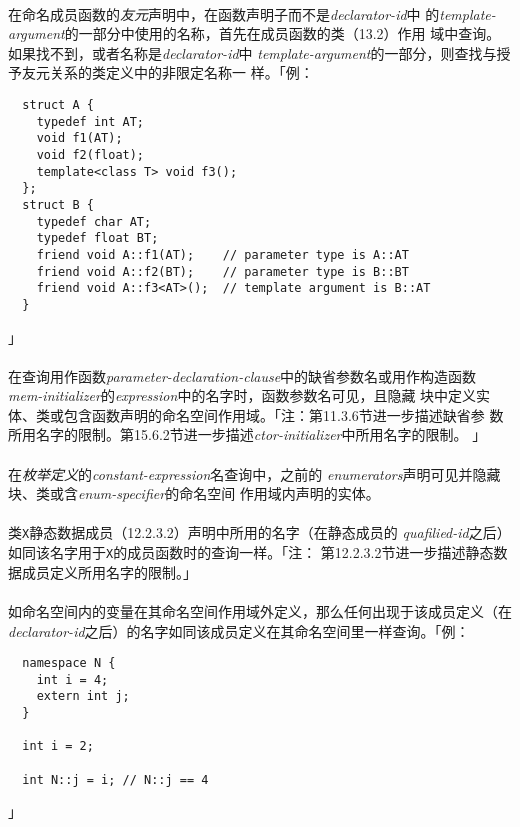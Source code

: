 \paragraph{}
在命名成员函数的\textit{友元}声明中，在函数声明子而不是\textit{declarator-id}中
的\textit{template-argument}的一部分中使用的名称，首先在成员函数的类（13.2）作用
域中查询。 如果找不到，或者名称是\textit{declarator-id}中
\textit{template-argument}的一部分，则查找与授予友元关系的类定义中的非限定名称一
样。「例：
\begin{lstlisting}
  struct A {
    typedef int AT;
    void f1(AT);
    void f2(float);
    template<class T> void f3();
  };
  struct B {
    typedef char AT;
    typedef float BT;
    friend void A::f1(AT);    // parameter type is A::AT
    friend void A::f2(BT);    // parameter type is B::BT
    friend void A::f3<AT>();  // template argument is B::AT
  }
\end{lstlisting}」

\paragraph{}
在查询用作函数\textit{parameter-declaration-clause}中的缺省参数名或用作构造函数
\textit{mem-initializer}的\textit{expression}中的名字时，函数参数名可见，且隐藏
块中定义实体、类或包含函数声明的命名空间作用域。「注：第11.3.6节进一步描述缺省参
数所用名字的限制。第15.6.2节进一步描述\textit{ctor-initializer}中所用名字的限制。
」

\paragraph{}
在\textit{枚举定义}的\textit{constant-expression}名查询中，之前的
\textit{enumerators}声明可见并隐藏块、类或含\textit{enum-specifier}的命名空间
作用域内声明的实体。

\paragraph{}
类\texttt{X}静态数据成员（12.2.3.2）声明中所用的名字（在静态成员的
\textit{quafilied-id}之后）如同该名字用于\texttt{X}的成员函数时的查询一样。「注：
第12.2.3.2节进一步描述静态数据成员定义所用名字的限制。」

\paragraph{}
如命名空间内的变量在其命名空间作用域外定义，那么任何出现于该成员定义（在
\textit{declarator-id}之后）的名字如同该成员定义在其命名空间里一样查询。「例：
\begin{lstlisting}
  namespace N {
    int i = 4;
    extern int j;
  }

  int i = 2;

  int N::j = i; // N::j == 4
\end{lstlisting}
」

